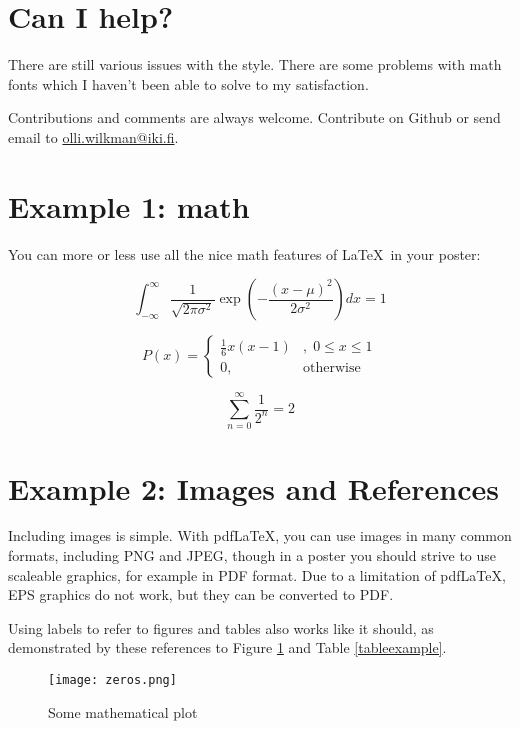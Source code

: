 \documentclass[a0paper,smallertitle]{test1}
\begin{document}
\section*{Can I help?}
There are still various issues with the style. There are some problems with math fonts which I haven't been able to solve to my satisfaction.

Contributions and comments are always welcome. Contribute on Github or send email to \url{olli.wilkman@iki.fi}.



\section*{Example 1: math}
You can more or less use all the nice math features of \LaTeX~in your poster:

\begin{equation}
    \int_{-\infty}^{\infty} \frac{1}{\sqrt{2 \pi \sigma^2}} \exp\left(-\frac{(x - \mu)^2}{2 \sigma^2} \right) dx = 1
\end{equation}

\begin{equation}
    P(x) = \left\{ \begin{array}{lr} \frac{1}{6}x(x-1)&,\; 0 \leq x \leq 1 \\ 0, & \text{otherwise}  \end{array} \right.
\end{equation}

\begin{equation}
    \sum_{n=0}^\infty \frac{1}{2^n} = 2
\end{equation}



\section*{Example 2: Images and References}
Including images is simple.  With pdf\LaTeX, you can use images in many common formats, including PNG and JPEG, though in a poster you should strive to use scaleable graphics, for example in PDF format. Due to a limitation of pdf\LaTeX, EPS graphics do not work, but they can be converted to PDF.
    
Using labels to refer to figures and tables also works like it should, as demonstrated by these references to Figure \ref{examplefigure} and Table \ref{tableexample}.

\begin{figure}[H]
\texttt{[image: zeros.png]}
\caption{Some mathematical plot \label{examplefigure}}
\end{figure}
\end{document}
